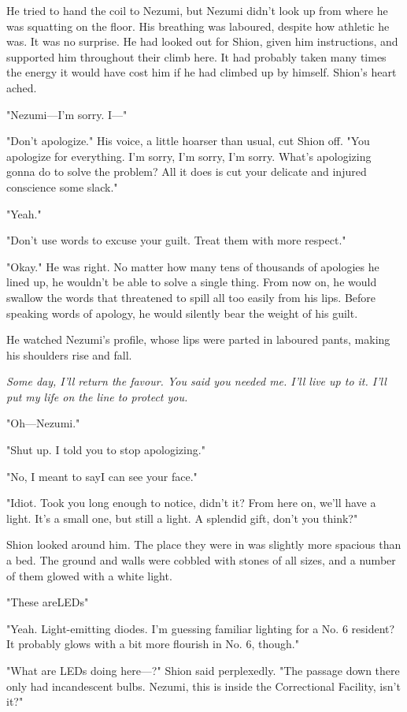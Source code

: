 He tried to hand the coil to Nezumi, but Nezumi didn't look up from
where he was squatting on the floor. His breathing was laboured, despite
how athletic he was. It was no surprise. He had looked out for Shion,
given him instructions, and supported him throughout their climb here.
It had probably taken many times the energy it would have cost him if he
had climbed up by himself. Shion's heart ached.

"Nezumi---I'm sorry. I---"

"Don't apologize." His voice, a little hoarser than usual, cut Shion
off. "You apologize for everything. I'm sorry, I'm sorry, I'm sorry.
What's apologizing gonna do to solve the problem? All it does is cut
your delicate and injured conscience some slack."

"Yeah."

"Don't use words to excuse your guilt. Treat them with more respect."

"Okay." He was right. No matter how many tens of thousands of apologies
he lined up, he wouldn't be able to solve a single thing. From now on,
he would swallow the words that threatened to spill all too easily from
his lips. Before speaking words of apology, he would silently bear the
weight of his guilt.

He watched Nezumi's profile, whose lips were parted in laboured pants,
making his shoulders rise and fall.

\emph{Some day, I'll return the favour. You said you needed me. I'll live up
to it. I'll put my life on the line to protect you.}

"Oh---Nezumi."

"Shut up. I told you to stop apologizing."

"No, I meant to say\el I can see your face."

"Idiot. Took you long enough to notice, didn't it? From here on, we'll
have a light. It's a small one, but still a light. A splendid gift,
don't you think?"

Shion looked around him. The place they were in was slightly more
spacious than a bed. The ground and walls were cobbled with stones of
all sizes, and a number of them glowed with a white light.

"These are\el LEDs\el "

"Yeah. Light-emitting diodes. I'm guessing familiar lighting for a No. 6
resident? It probably glows with a bit more flourish in No. 6, though."

"What are LEDs doing here---?" Shion said perplexedly. "The passage down
there only had incandescent bulbs. Nezumi, this is inside the
Correctional Facility, isn't it?"

